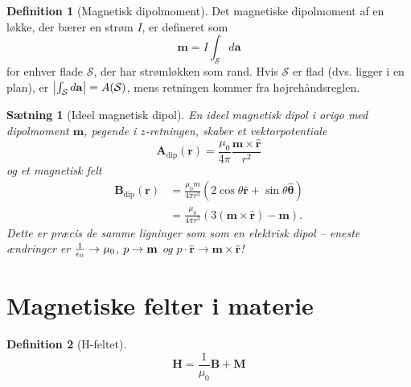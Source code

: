 \documentclass[]{article}
\newcommand{\hr}{\hat{\mathbf{r}}}
\newcommand{\hth}{\hat{\bm{\theta}}}
\newtheorem{theorem}{Sætning}
\theoremstyle{definition}
\newtheorem{definition}{Definition}
\begin{document}
\begin{definition}[Magnetisk dipolmoment]
	Det magnetiske dipolmoment af en løkke, der bærer en strøm $I$, er defineret som
	\begin{equation*}
		\mathbf{m} = I \int_\mathcal{S}{d\mathbf{a}}
	\end{equation*}
	for enhver flade $\mathcal{S}$, der har strømløkken som rand. Hvis $\mathcal{S}$ er flad (dvs. ligger i en plan), er $\abs{\int_\mathcal{S}{d\mathbf{a}}} = A(\mathcal{S})$, mens retningen kommer fra højrehåndsreglen.
\end{definition}

\begin{theorem}[Ideel magnetisk dipol]
	En ideel magnetisk dipol i origo med dipolmoment $\mathbf{m}$, pegende i $z$-retningen, skaber et vektorpotentiale
	\begin{equation*}
		\mathbf{A}_\text{dip}(\mathbf{r}) = \frac{\mu_0}{4\pi} \frac{\mathbf{m} \times \hat {\mathbf{r}}}{r^2}
	\end{equation*}
	og et magnetisk felt
	\begin{align*}
		\mathbf{B}_\text{dip}(\mathbf{r}) &= \frac{\mu_0m}{4\pi r^3}(2 \cos \theta \hr + \sin \theta \hth)\\
		&= \frac{\mu_0}{4\pi r^3}(3(\mathbf{m}\times \hr) - \mathbf{m}).
	\end{align*}
	Dette er præcis de samme ligninger som som en elektrisk dipol -- eneste ændringer er $\frac{1}{\epsilon_0} \rightarrow \mu_0$, $p \rightarrow \mathbf{m} $ og $p \cdot \hr \rightarrow \mathbf{m}\times \hr $!
\end{theorem}

\section{Magnetiske felter i materie}

\begin{definition}[H-feltet]
	\begin{equation*}
		\mathbf{H} = \dfrac{1}{\mu_0} \mathbf{B} + \mathbf{M}
	\end{equation*}
\end{definition}
\end{document}
